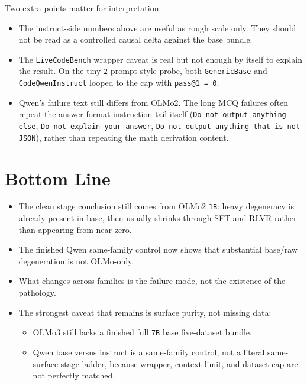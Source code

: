 \documentclass[11pt]{article}
\begin{document}
Two extra points matter for interpretation:
\begin{itemize}[leftmargin=1.5em]
\item The instruct-side numbers above are useful as rough scale only. They should not be read as a controlled causal delta against the base bundle.
\item The \texttt{LiveCodeBench} wrapper caveat is real but not enough by itself to explain the result. On the tiny \texttt{2}-prompt style probe, both \texttt{GenericBase} and \texttt{CodeQwenInstruct} looped to the cap with \texttt{pass@1 = 0}.
\item Qwen's failure text still differs from OLMo2. The long MCQ failures often repeat the answer-format instruction tail itself (\texttt{Do not output anything else}, \texttt{Do not explain your answer}, \texttt{Do not output anything that is not JSON}), rather than repeating the math derivation content.
\end{itemize}

\section*{Bottom Line}
\begin{itemize}[leftmargin=1.5em]
\item The clean stage conclusion still comes from OLMo2 \texttt{1B}: heavy degeneracy is already present in base, then usually shrinks through SFT and RLVR rather than appearing from near zero.
\item The finished Qwen same-family control now shows that substantial base/raw degeneration is not OLMo-only.
\item What changes across families is the failure mode, not the existence of the pathology.
\item The strongest caveat that remains is surface purity, not missing data:
\begin{itemize}[leftmargin=1.5em]
\item OLMo3 still lacks a finished full \texttt{7B} base five-dataset bundle.
\item Qwen base versus instruct is a same-family control, not a literal same-surface stage ladder, because wrapper, context limit, and dataset cap are not perfectly matched.
\end{itemize}
\end{itemize}
\end{document}
